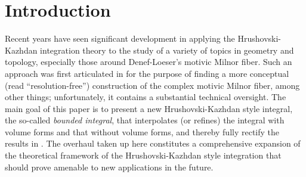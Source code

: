 \documentclass[12pt]{amsart}
\newcommand{\memph}[1]{{\color{magenta}\emph{#1}}}
\theoremstyle{plain}
\theoremstyle{definition}
\theoremstyle{remark}
\numberwithin{equation}{section}
\theoremstyle{plain}
\newcommand{\VF}{\textup{VF}}
\newcommand{\RV}{\textup{RV}}
\newcommand{\A}{\mathds{A}}
\newcommand{\0}{\emptyset}
\newcommand{\isp}{\textup{I}_{\textup{sp}}}
\begin{document}
%
%
%
%
%

\pagebreak

\section{Introduction}
Recent years have seen significant development in applying the Hrushovski-Kazhdan integration theory to the  study of a variety of topics in geometry and topology, especially those around Denef-Loeser's motivic Milnor fiber. Such an approach  was first articulated in  \cite{hru:loe:lef} for the purpose of  finding a more conceptual (read ``resolution-free'') construction of the complex  motivic Milnor fiber, among other things; unfortunately, it contains a substantial technical oversight. The main goal of this paper is to present a new Hrushovski-Kazhdan style integral,  the so-called \memph{bounded integral}, that interpolates (or refines) the integral with volume forms and that without volume forms, and thereby fully rectify the results in  \cite{hru:loe:lef}.
The overhaul taken up here constitutes a comprehensive expansion of the theoretical framework of the Hrushovski-Kazhdan style integration that should prove amenable to new applications in the future.
\end{document}
